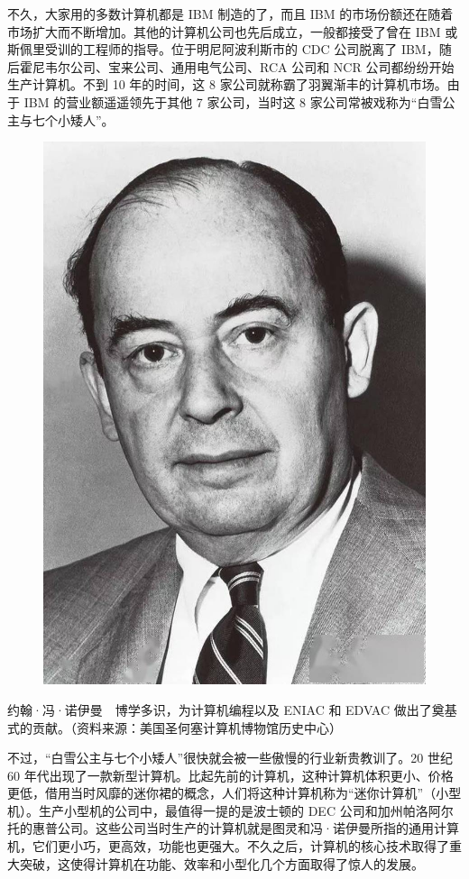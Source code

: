 \documentclass[12pt,UTF8]{ctexbook}
\begin{document}
不久，大家用的多数计算机都是 IBM 制造的了，而且 IBM 的市场份额还在随着市场扩大而不断增加。其他的计算机公司也先后成立，一般都接受了曾在 IBM 或斯佩里受训的工程师的指导。位于明尼阿波利斯市的 CDC 公司脱离了 IBM，随后霍尼韦尔公司、宝来公司、通用电气公司、RCA 公司和 NCR 公司都纷纷开始生产计算机。不到 10 年的时间，这 8 家公司就称霸了羽翼渐丰的计算机市场。由于 IBM 的营业额遥遥领先于其他 7 家公司，当时这 8 家公司常被戏称为“白雪公主与七个小矮人”。

\begin{figure}[htbp]
	\centering
	\includegraphics[width=0.7\linewidth]{9}
	\caption{}
	\label{fig:1}
\end{figure}

约翰·冯·诺伊曼　博学多识，为计算机编程以及 ENIAC 和 EDVAC 做出了奠基式的贡献。（资料来源：美国圣何塞计算机博物馆历史中心）

不过，“白雪公主与七个小矮人”很快就会被一些傲慢的行业新贵教训了。20 世纪 60 年代出现了一款新型计算机。比起先前的计算机，这种计算机体积更小、价格更低，借用当时风靡的迷你裙的概念，人们将这种计算机称为“迷你计算机”（小型机）。生产小型机的公司中，最值得一提的是波士顿的 DEC 公司和加州帕洛阿尔托的惠普公司。这些公司当时生产的计算机就是图灵和冯·诺伊曼所指的通用计算机，它们更小巧，更高效，功能也更强大。不久之后，计算机的核心技术取得了重大突破，这使得计算机在功能、效率和小型化几个方面取得了惊人的发展。
\end{document}
